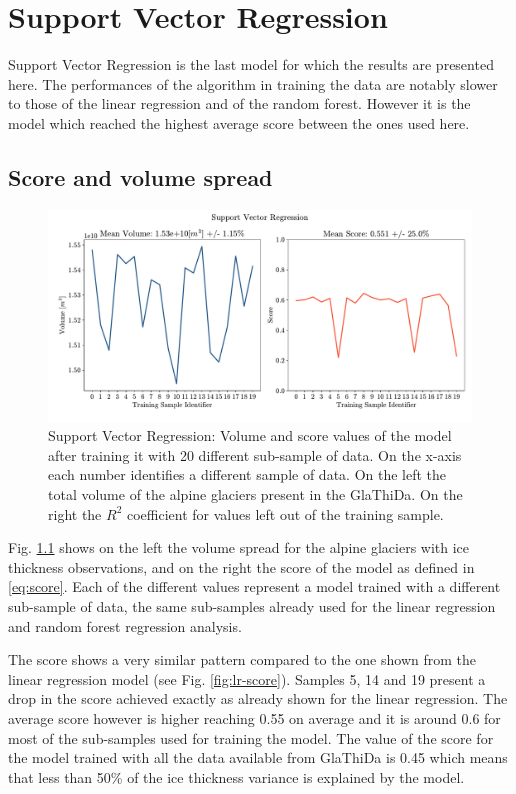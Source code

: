 \section{Support Vector Regression}\label{svr}
Support Vector Regression is the last model for which the results are presented here. The performances of the algorithm in training the data are notably slower to those of the linear regression and of the random forest. However it is the model which reached the highest average score between the ones used here. 

\subsection{Score and volume spread}\label{svr-score}

\begin{figure}[!tp]
	\centering		  
	\includegraphics[width=1.\textwidth]{figures/SVR_score.pdf}
	\caption{Support Vector Regression: Volume and score values of the model after training it with 20 different sub-sample of data. On the x-axis each number identifies a different sample of data. On the left the total volume of the alpine glaciers present in the GlaThiDa. On the right the $R^2$ coefficient for values left out of the training sample.}
	\label{fig:svr-score}
\end{figure}

Fig. \ref{svr-score} shows on the left the volume spread for the alpine glaciers with ice thickness observations, and on the right the score of the model as defined in \ref{eq:score}. Each of the different values represent a model trained with a different sub-sample of data, the same sub-samples already used for the linear regression and random forest regression analysis.

The score shows a very similar pattern compared to the one shown from the linear regression model (see Fig. \ref{fig:lr-score}). Samples 5, 14 and 19 present a drop in the score achieved exactly as already shown for the linear regression. The average score however is higher reaching 0.55 on average and it is around 0.6 for most of the sub-samples used for training the model.
The value of the score for the model trained with all the data available from GlaThiDa is 0.45 which means that less than 50\% of the ice thickness variance is explained by the model. 

